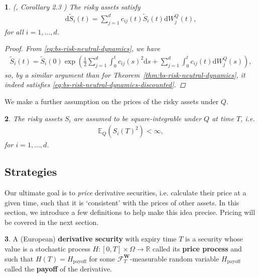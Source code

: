 \documentclass[english]{article}
\numberwithin{equation}{section}
\numberwithin{figure}{section}
\theoremstyle{bolddescit}
\newtheorem{theorem}{\protect\theoremname}[section]
\theoremstyle{definition}
\newtheorem{definition}[theorem]{\protect\definitionname}
\theoremstyle{definition}
\theoremstyle{plain}
\theoremstyle{plain}
\theoremstyle{bolddesc}
\newtheorem{assumption}[theorem]{\protect\assumptionname}
\theoremstyle{plain}
\theoremstyle{remark}
\providecommand{\assumptionname}{Assumption}
\providecommand{\definitionname}{Definition}
\providecommand{\theoremname}{Theorem}
\begin{document}
\begin{theorem}\label{thm:bs-risk-neutral-dynamics-discounted}
  (\cite{capinski_blackscholes_2012}, Corollary 2.3 )
  The risky assets satisfy
  \begin{align}\label{eq:bs-risk-neutral-dynamics-discounted}
    \mathrm{d}\widetilde{S}_i(t) = \sum_{j=1}^{d} c_{ij}(t) \widetilde{S}_i(t) \mathrm{d}W^Q_j(t),
  \end{align}
  for all $i=1,\ldots,d$.

  \begin{proof}
    From \eqref{eq:bs-risk-neutral-dynamics}, we have
    \begin{align*}
      \widetilde{S}_i(t)
      = \widetilde{S}_i(0) \exp \left( \frac{1}{2} \sum_{j=1}^{d} \int_0^t c_{ij}(s)^2 \mathrm{d}s + \sum_{j=1}^d \int_0^t c_{ij}(t) \mathrm{d}W^Q_j(s)\right),
    \end{align*}
    so, by a similar argument than for Theorem~\ref{thm:bs-risk-neutral-dynamics}, it indeed satisfies \eqref{eq:bs-risk-neutral-dynamics-discounted}.
  \end{proof}
\end{theorem}

We make a further assumption on the prices of the risky assets under $Q$.

\begin{assumption}\label{ass:bs-stock-price-square-integrability}
  The risky assets $S_i$ are assumed to be square-integrable under $Q$ at time $T$, i.e.
  \begin{align*}
    \mathbb{E}_Q(S_i(T)^2) < \infty,
  \end{align*}
  for $i=1,\ldots,d$.
\end{assumption}

\subsection{Strategies}

Our ultimate goal is to \textit{price} derivative securities, i.e. calculate their price at a given time, such that it is `consistent' with the prices of other assets. In this section, we introduce a few definitions to help make this idea precise. Pricing will be covered in the next section.

\begin{definition}
  A (European) \textbf{derivative security} with expiry time $T$ is a security whose value is a stochastic process $H : [0,T] \times \Omega \to \mathbb{R}$ called its \textbf{price process} and such that $H(T) = H_\text{payoff}$ for some $\mathcal{F}^\mathbf{W}_T$-measurable random variable $H_\text{payoff}$ called the \textbf{payoff} of the derivative.
\end{definition}
\end{document}
